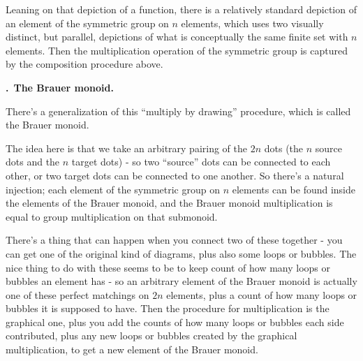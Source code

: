 \documentclass[11pt,noamsfonts]{amsart}
\newcommand{\pointheader}{\vspace{2mm}\noindent\refstepcounter{section}\textbf{\thesection.}}
\newcommand{\bpoint}[1]{\pointheader~{\bf #1.}}
\begin{document}
Leaning on that depiction of a function, there is a relatively standard depiction of an element of the symmetric group on \(n\) elements, which uses two visually distinct, but parallel, depictions of what is conceptually the same finite set with \(n\) elements. Then the multiplication operation of the symmetric group is captured by the composition procedure above.


\bpoint{The Brauer monoid}

There's a generalization of this ``multiply by drawing'' procedure, which is called the Brauer monoid.

The idea here is that we take an arbitrary pairing of the \(2 n\) dots (the \(n\) source dots and the \(n\) target dots) - so two ``source'' dots can be connected to each other, or two target dots can be connected to one another. So there's a natural injection; each element of the symmetric group on \(n\) elements can be found inside the elements of the Brauer monoid, and the Brauer monoid multiplication is equal to group multiplication on that submonoid.

There's a thing that can happen when you connect two of these together - you can get one of the original kind of diagrams, plus also some loops or bubbles. The nice thing to do with these seems to be to keep count of how many loops or bubbles an element has - so an arbitrary element of the Brauer monoid is actually one of these perfect matchings on \(2 n\) elements, plus a count of how many loops or bubbles it is supposed to have. Then the procedure for multiplication is the graphical one, plus you add the counts of how many loops or bubbles each side contributed, plus any new loops or bubbles created by the graphical multiplication, to get a new element of the Brauer monoid.
\end{document}
